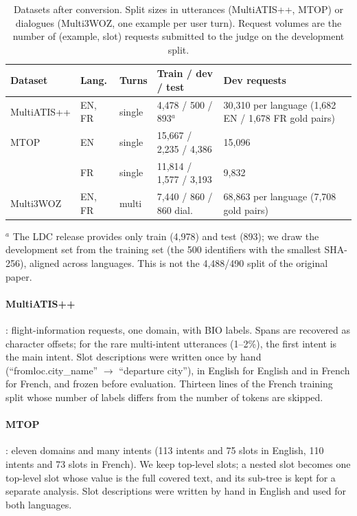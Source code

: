 \begin{table}[pos=t]
\centering
\small
\caption{Datasets after conversion. Split sizes in utterances (MultiATIS++, MTOP) or dialogues (Multi3WOZ, one example per user turn). Request volumes are the number of (example, slot) requests submitted to the judge on the development split.}
\label{tab:datasets}
\begin{tabular}{@{}lllp{3.0cm}p{4.2cm}@{}}
\toprule
Dataset & Lang. & Turns & Train / dev / test & Dev requests \\
\midrule
MultiATIS++ & EN, FR & single & 4,478 / 500 / 893$^{a}$ & 30,310 per language (1,682 EN / 1,678 FR gold pairs) \\
MTOP & EN & single & 15,667 / 2,235 / 4,386 & 15,096 \\
     & FR & single & 11,814 / 1,577 / 3,193 & 9,832 \\
Multi3WOZ & EN, FR & multi & 7,440 / 860 / 860 dial. & 68,863 per language (7,708 gold pairs) \\
\bottomrule
\end{tabular}

\smallskip
\footnotesize $^{a}$ The LDC release provides only train (4,978) and test (893); we draw the development set from the training set (the 500 identifiers with the smallest SHA-256), aligned across languages. This is not the 4,488/490 split of the original paper.
\end{table}

\paragraph{MultiATIS++} \citep{xu2020multiatis,mansour2021atis7}: flight-information requests, one domain, with BIO labels. Spans are recovered as character offsets; for the rare multi-intent utterances (1--2\%), the first intent is the main intent. Slot descriptions were written once by hand (``fromloc.city\_name'' $\rightarrow$ ``departure city''), in English for English and in French for French, and frozen before evaluation. Thirteen lines of the French training split whose number of labels differs from the number of tokens are skipped.

\paragraph{MTOP} \citep{li2021mtop}: eleven domains and many intents (113 intents and 75 slots in English, 110 intents and 73 slots in French). We keep top-level slots; a nested slot becomes one top-level slot whose value is the full covered text, and its sub-tree is kept for a separate analysis. Slot descriptions were written by hand in English and used for both languages.

